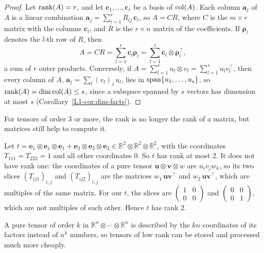 \begin{proof}
    Let $\operatorname{rank}(A) = r$, and let $\mathbf{c}_1, \ldots, \mathbf{c}_r$ be a basis of $\operatorname{col}(A)$. Each column $\mathbf{a}_j$ of $A$ is a linear combination $\mathbf{a}_j = \sum_{l=1}^r R_{lj}\, \mathbf{c}_l$, so $A = CR$, where $C$ is the $m \times r$ matrix with the columns $\mathbf{c}_l$, and $R$ is the $r \times n$ matrix of the coefficients. If $\boldsymbol{\rho}_l$ denotes the $l$-th row of $R$, then
    \[A = CR = \sum_{l=1}^r \mathbf{c}_l \boldsymbol{\rho}_l = \sum_{l=1}^r \mathbf{c}_l \otimes \boldsymbol{\rho}_l^\top,\]
    a sum of $r$ outer products. Conversely, if $A = \sum_{l=1}^s u_l \otimes v_l = \sum_{l=1}^s u_l v_l^\top$, then every column of $A$, $\mathbf{a}_j = \sum_l (v_l)_j\, u_l$, lies in $\operatorname{span}\{u_1, \ldots, u_s\}$, so $\operatorname{rank}(A) = \dim \operatorname{col}(A) \leq s$, since a subspace spanned by $s$ vectors has dimension at most $s$ (Corollary~\ref{L1-cor:dim-facts}).
\end{proof}

For tensors of order $3$ or more, the rank is no longer the rank of a matrix, but matrices still help to compute it.

\begin{example}\label{L1-ex:tensor-rank-2}
    Let $t = \mathbf{e}_1 \otimes \mathbf{e}_1 \otimes \mathbf{e}_1 + \mathbf{e}_2 \otimes \mathbf{e}_2 \otimes \mathbf{e}_2 \in \mathbb{R}^2 \otimes \mathbb{R}^2 \otimes \mathbb{R}^2$, with the coordinates $T_{111} = T_{222} = 1$ and all other coordinates $0$. So $t$ has rank at most $2$. It does not have rank one: the coordinates of a pure tensor $\mathbf{u} \otimes \mathbf{v} \otimes w$ are $u_iv_jw_k$, so its two slices $(T_{ij1})_{i,j}$ and $(T_{ij2})_{i,j}$ are the matrices $w_1\, \mathbf{u}\mathbf{v}^\top$ and $w_2\, \mathbf{u}\mathbf{v}^\top$, which are multiples of the same matrix. For our $t$, the slices are $\left(\begin{smallmatrix} 1 & 0 \\ 0 & 0 \end{smallmatrix}\right)$ and $\left(\begin{smallmatrix} 0 & 0 \\ 0 & 1 \end{smallmatrix}\right)$, which are not multiples of each other. Hence $t$ has rank $2$.
\end{example}

A pure tensor of order $k$ in $\mathbb{R}^n \otimes \cdots \otimes \mathbb{R}^n$ is described by the $kn$ coordinates of its factors instead of $n^k$ numbers, so tensors of low rank can be stored and processed much more cheaply.


